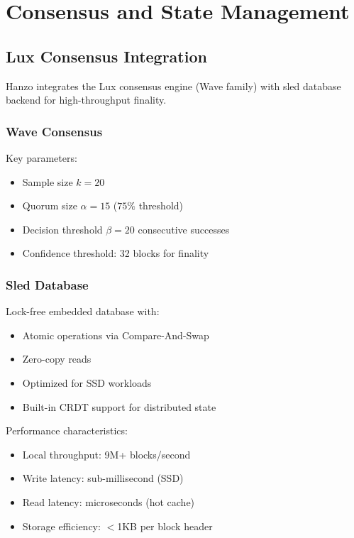 \section{Consensus and State Management}


\subsection{Lux Consensus Integration}

Hanzo integrates the Lux consensus engine (Wave family) with sled database backend for high-throughput finality.

\subsubsection{Wave Consensus}

Key parameters:
\begin{itemize}
\item Sample size $k = 20$
\item Quorum size $\alpha = 15$ ($75\%$ threshold)
\item Decision threshold $\beta = 20$ consecutive successes
\item Confidence threshold: 32 blocks for finality
\end{itemize}

\subsubsection{Sled Database}

Lock-free embedded database with:
\begin{itemize}
\item Atomic operations via Compare-And-Swap
\item Zero-copy reads
\item Optimized for SSD workloads
\item Built-in CRDT support for distributed state
\end{itemize}

Performance characteristics:
\begin{itemize}
\item Local throughput: 9M+ blocks/second
\item Write latency: sub-millisecond (SSD)
\item Read latency: microseconds (hot cache)
\item Storage efficiency: $<$1KB per block header
\end{itemize}

